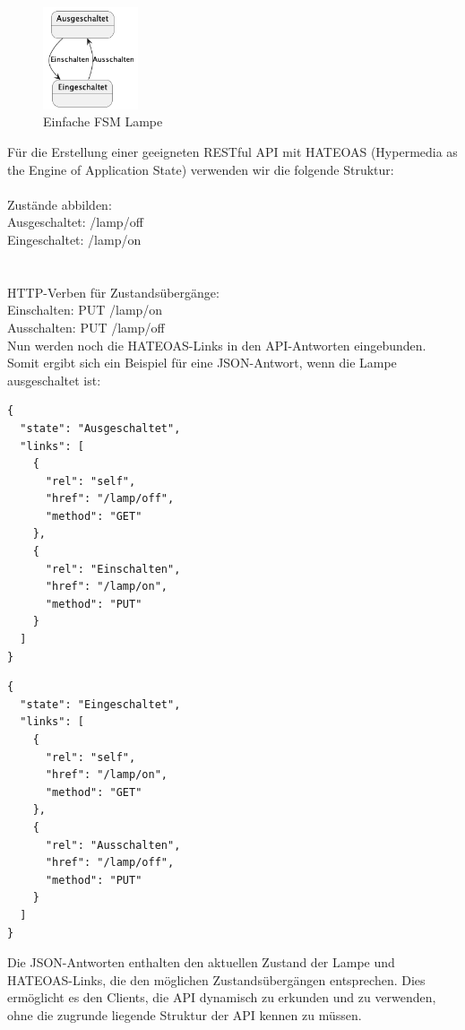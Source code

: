 \begin{figure}[!ht]
  \centering
  \includegraphics[width=0.25\textwidth]{fig/uml/lampe.png}
  \caption{Einfache FSM Lampe}
  \label{fig:lampe}
\end{figure}

Für die Erstellung einer geeigneten RESTful API mit HATEOAS (Hypermedia as the Engine of Application State) verwenden wir die folgende Struktur:
\\\\
Zustände abbilden:
\\
Ausgeschaltet: /lamp/off\\
Eingeschaltet: /lamp/on\\
\\\\
HTTP-Verben für Zustandsübergänge:
\\
Einschalten: PUT /lamp/on\\
Ausschalten: PUT /lamp/off\\

Nun werden noch die HATEOAS-Links in den API-Antworten eingebunden. Somit ergibt sich ein Beispiel für eine JSON-Antwort, wenn die Lampe ausgeschaltet ist:\\
\noindent\begin{minipage}{\textwidth}
\begin{lstlisting}[caption={Fallbeispiel REST - aus},captionpos=b,label={lst:rest_on}]
{
  "state": "Ausgeschaltet",
  "links": [
    {
      "rel": "self",
      "href": "/lamp/off",
      "method": "GET"
    },
    {
      "rel": "Einschalten",
      "href": "/lamp/on",
      "method": "PUT"
    }
  ]
}
\end{lstlisting}
\end{minipage}

\noindent\begin{minipage}{\textwidth}
\begin{lstlisting}[caption={Fallbeispiel REST - an},captionpos=b,label={lst:rest_an}]
{
  "state": "Eingeschaltet",
  "links": [
    {
      "rel": "self",
      "href": "/lamp/on",
      "method": "GET"
    },
    {
      "rel": "Ausschalten",
      "href": "/lamp/off",
      "method": "PUT"
    }
  ]
}
\end{lstlisting}
\end{minipage}
Die JSON-Antworten enthalten den aktuellen Zustand der Lampe und HATEOAS-Links, die den möglichen Zustandsübergängen entsprechen. Dies ermöglicht es den Clients, die API dynamisch zu erkunden und zu verwenden, ohne die zugrunde liegende Struktur der API kennen zu müssen.

